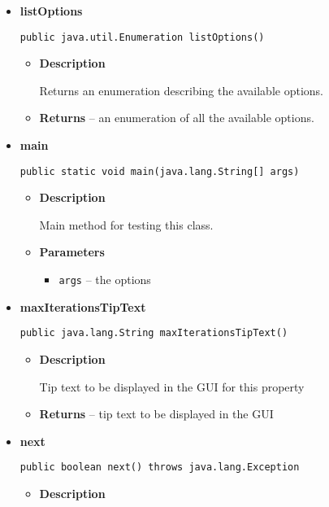 \documentclass[11pt,a4paper]{report}
\begin{document}
{{{{{\begin{itemize}
{\begin{itemize}
{Makes copies of the training data which can be mutated, and initialise the array of Classifier objects
}
\item{
{\bf  Parameters}
  \begin{itemize}
   \item{
\texttt{instances} -- the training data}
  \end{itemize}
}%
\end{itemize}
}%
\item{ 
{\bf  listOptions}\\
\begin{lstlisting}[frame=none]
public java.util.Enumeration listOptions()\end{lstlisting} %
\begin{itemize}
\item{
{\bf  Description}

Returns an enumeration describing the available options.
}
\item{{\bf  Returns} -- 
an enumeration of all the available options. 
}%
\end{itemize}
}%
\item{ 
{\bf  main}\\
\begin{lstlisting}[frame=none]
public static void main(java.lang.String[] args)\end{lstlisting} %
\begin{itemize}
\item{
{\bf  Description}

Main method for testing this class.
}
\item{
{\bf  Parameters}
  \begin{itemize}
   \item{
\texttt{args} -- the options}
  \end{itemize}
}%
\end{itemize}
}%
\item{ 
{\bf  maxIterationsTipText}\\
\begin{lstlisting}[frame=none]
public java.lang.String maxIterationsTipText()\end{lstlisting} %
\begin{itemize}
\item{
{\bf  Description}

Tip text to be displayed in the GUI for this property
}
\item{{\bf  Returns} -- 
tip text to be displayed in the GUI 
}%
\end{itemize}
}%
\item{ 
{\bf  next}\\
\begin{lstlisting}[frame=none]
public boolean next() throws java.lang.Exception\end{lstlisting} %
\begin{itemize}
\item{
{\bf  Description}

}
\end{itemize}}
\end{itemize}}}}}}
\end{document}
